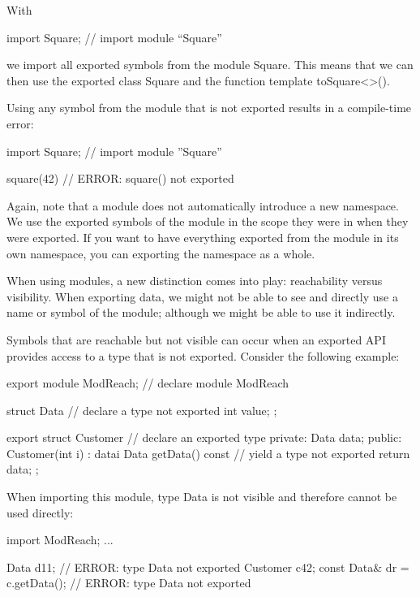 With

\begin{cpp}
import Square; // import module “Square”
\end{cpp}

we import all exported symbols from the module Square. This means that we can then use the exported class Square and the function template toSquare<>().

Using any symbol from the module that is not exported results in a compile-time error:

\begin{cpp}
import Square; // import module ”Square”

square(42) // ERROR: square() not exported
\end{cpp}

Again, note that a module does not automatically introduce a new namespace. We use the exported symbols of the module in the scope they were in when they were exported. If you want to have everything exported from the module in its own namespace, you can exporting the namespace as a whole.


When using modules, a new distinction comes into play: reachability versus visibility. When exporting data, we might not be able to see and directly use a name or symbol of the module; although we might be able to use it indirectly.

Symbols that are reachable but not visible can occur when an exported API provides access to a type that is not exported. Consider the following example:

\begin{cpp}
export module ModReach; // declare module ModReach

struct Data { // declare a type not exported
	int value;
};

export struct Customer { // declare an exported type
private:
	Data data;
public:
	Customer(int i)
	: data{i} {
	}
	Data getData() const { // yield a type not exported
		return data;
	}
};
\end{cpp}

When importing this module, type Data is not visible and therefore cannot be used directly:

\begin{cpp}
import ModReach;
...

Data d{11}; // ERROR: type Data not exported
Customer c{42};
const Data& dr = c.getData(); // ERROR: type Data not exported
\end{cpp}


